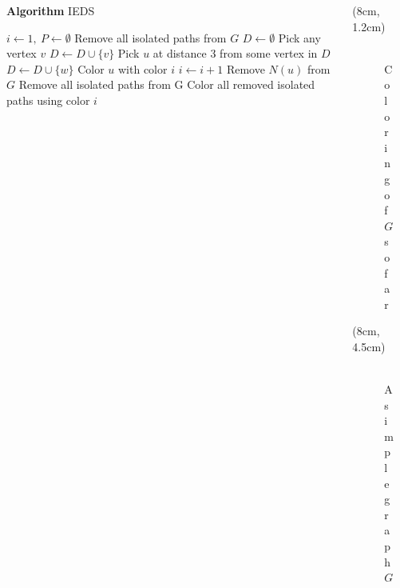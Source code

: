 {  \begin{columns}
    \begin{column}{0.5\textwidth}
      \begin{algorithm}[H]
        \caption*{\textbf{Algorithm} IEDS}
        \scriptsize
        \begin{algorithmic}[1]
        \State $i \gets 1,\ P \gets \emptyset$
        \State Remove all isolated paths from $G$
          \State $D \gets \emptyset$
            \State Pick any vertex $v$
            \State $D \gets D \cup \{ v \}$
              \State Pick $u$ at distance 3 from some vertex in $D$
              \State $D \gets D \cup \{ w \}$
            \EndWhile
              \State Color $u$ with color $i$
            \EndFor
            \State $i \gets i + 1$
              \CSTATE Remove $N(u)$ from $G$
            \EndFor
            \State Remove all isolated paths from G
          \EndFor
        \EndWhile
        \State Color all removed isolated paths using color $i$
        \end{algorithmic}
      \end{algorithm}
    \end{column}
    \begin{column}{0.5\textwidth}
      \begin{center}
        \begin{textblock*}{8cm}(8cm, 1.2cm) %
          \begin{figure}
            \centering
            \includegraphics[width=5.7cm]{../figures/algorithm1-step1.pdf}
            \caption*{Coloring of $G$ so far}
          \end{figure}
        \end{textblock*}
        \begin{textblock*}{8cm}(8cm, 4.5cm) %
          \begin{figure}
            \centering
            \includegraphics[width=3.5cm]{../figures/algorithm1-slide-4.pdf}
            \caption*{A simple graph $G$}
          \end{figure}
        \end{textblock*}
      \end{center}
    \end{column}
  \end{columns}
}

